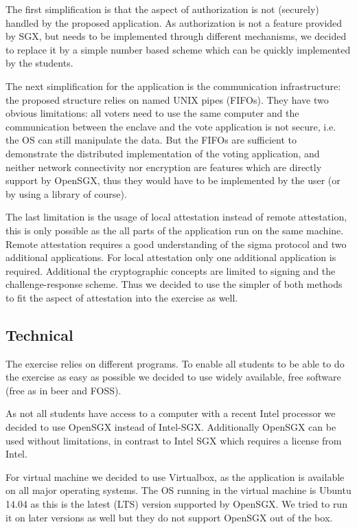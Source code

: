 \documentclass[DIN, pagenumber=false, fontsize=11pt, parskip=half]{scrartcl}
\begin{document}
    The first simplification is that the aspect of authorization is not (securely)
    handled by the proposed application. As authorization is not a feature provided
    by SGX, but needs to be implemented through different mechanisms, we decided
    to replace it by a simple number based scheme which can be quickly implemented
    by the students.

    The next simplification for the application is the communication infrastructure:
    the proposed structure relies on named UNIX pipes (FIFOs). They have two obvious
    limitations: all voters need to use the same computer and the communication
    between the enclave and the vote application is not secure, i.e. the OS can
    still manipulate the data. But the FIFOs are sufficient to demonstrate the distributed
    implementation of the voting application, and neither network connectivity nor
    encryption are features which are directly support by OpenSGX, thus they would have
    to be implemented by the user (or by using a library of course).

    The last limitation is the usage of local attestation instead of remote attestation,
    this is only possible as the all parts of the application run on the same machine.
    Remote attestation requires a good understanding of the sigma protocol and two 
    additional applications. For local attestation only one additional application
    is required. Additional the cryptographic concepts are limited to signing and
    the challenge-response scheme. Thus we decided to use the simpler of both methods
    to fit the aspect of attestation into the exercise as well.

    \subsection{Technical}
    The exercise relies on different programs. To enable all students to be able
    to do the exercise as easy as possible we decided to use widely available,
    free software (free as in beer and FOSS).

    As not all students have access to a computer with a recent Intel processor
    we decided to use OpenSGX instead of Intel-SGX. Additionally OpenSGX can be
    used without limitations, in contrast to Intel SGX which requires a license
    from Intel.
    
    For virtual machine we decided to use Virtualbox, as the application is
    available on all major operating systems. The OS running in the virtual
    machine is Ubuntu 14.04 as this is the latest (LTS) version supported by
    OpenSGX. We tried to run it on later versions as well but they do not support
    OpenSGX out of the box.
\end{document}
